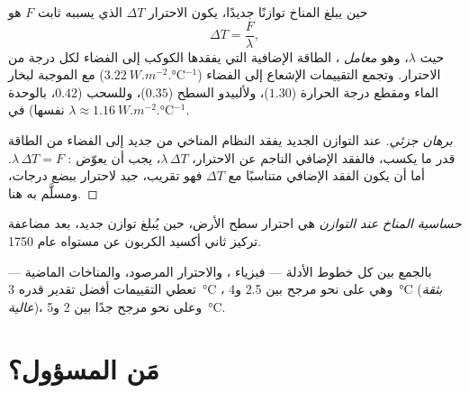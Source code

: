 \begin{proposition}\label{prop:g12:climate-change:equilibrium}
حين يبلغ المناخ توازنًا جديدًا، يكون الاحترار $\Delta T$ الذي يسببه
 ثابت $F$ هو
\[
  \Delta T = \frac{F}{\lambda},
\]
حيث $\lambda$، وهو \emph{معامل }، الطاقة الإضافية
التي يفقدها الكوكب إلى الفضاء لكل درجة من الاحترار. وتجمع التقييمات
الإشعاع إلى الفضاء ($\qty{3.22}{W.m^{-2}.\degreeCelsius^{-1}}$)
مع  الموجبة لبخار الماء ومقطع درجة الحرارة
($1.30$)، ولألبيدو السطح ($0.35$)، وللسحب ($0.42$، بالوحدة
نفسها) في $\lambda \approx \qty{1.16}{W.m^{-2}.\degreeCelsius^{-1}}$.
\end{proposition}

\begin{proof}[برهان جزئي]
عند التوازن الجديد يفقد النظام المناخي من جديد إلى الفضاء من الطاقة قدر
ما يكسب، فالفقد الإضافي الناجم عن الاحترار، $\lambda\,\Delta T$، يجب
أن يعوّض : $\lambda\,\Delta T = F$. أما أن يكون الفقد الإضافي
متناسبًا مع $\Delta T$ فهو تقريب، جيد لاحترار ببضع
درجات، ومسلَّم به هنا.
\end{proof}

\begin{definition}\label{def:g12:climate-change:ecs}
\emph{حساسية المناخ عند التوازن}
هي احترار سطح الأرض، حين يُبلغ توازن جديد، بعد
مضاعفة تركيز ثاني أكسيد الكربون عن مستواه عام 1750.
\end{definition}

\begin{proposition}\label{prop:g12:climate-change:ecs}
بالجمع بين كل خطوط الأدلة --- فيزياء ،
والاحترار المرصود، والمناخات الماضية --- تعطي التقييمات أفضل تقدير
قدره \qty{3}{\degreeCelsius} ، وهي على نحو مرجح
بين 2.5 و\qty{4}{\degreeCelsius} (\emph{بثقة عالية})، وعلى نحو مرجح
جدًا بين 2 و\qty{5}{\degreeCelsius}.
\end{proposition}

\section{مَن المسؤول؟}

